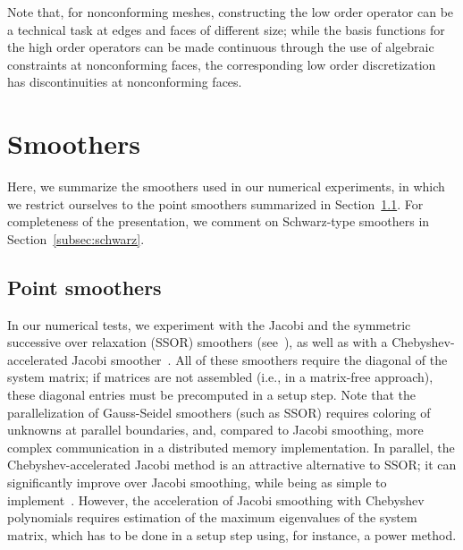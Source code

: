 \documentclass[smallcondensed,final]{svjour3}     %
\begin{document}
Note that, for nonconforming meshes, constructing the low order
operator can be a technical task at edges and faces of different size;
while the basis functions for the high order operators can be made
continuous through the use of algebraic constraints at nonconforming
faces, the corresponding low order discretization has discontinuities
at nonconforming faces.









\section{Smoothers}
Here, we summarize the smoothers used in our numerical experiments, in
which we restrict ourselves to the point smoothers summarized in
Section~\ref{subsec:ptsmoothers}. For completeness of the
presentation, we comment on Schwarz-type smoothers in
Section~\ref{subsec:schwarz}.


\subsection{Point smoothers}\label{subsec:ptsmoothers}
In our numerical tests, we experiment with the Jacobi and the
symmetric successive over relaxation (SSOR) smoothers
(see~\cite{TrottenbergOosterleeSchuller01}), as well as with a
Chebyshev-accelerated Jacobi smoother~\cite{....}. All of these
smoothers require the diagonal of the system matrix; if matrices are
not assembled (i.e., in a matrix-free approach), these diagonal
entries must be precomputed in a setup step.  Note that the
parallelization of Gauss-Seidel smoothers (such as SSOR) requires
coloring of unknowns at parallel boundaries, and, compared to Jacobi
smoothing, more complex communication in a distributed memory
implementation. In parallel, the Chebyshev-accelerated Jacobi method
is an attractive alternative to SSOR; it can significantly improve
over Jacobi smoothing, while being as simple to
implement~\cite{AdamsBrezinaHuEtAl03}. However, the acceleration of
Jacobi smoothing with Chebyshev polynomials requires estimation of the
maximum eigenvalues of the system matrix, which has to be done in a
setup step using, for instance, a power method.
\end{document}

